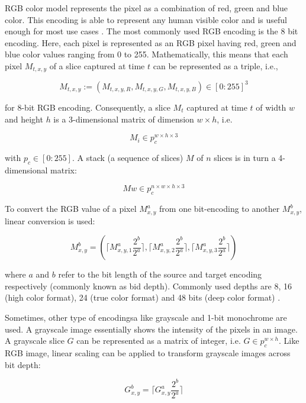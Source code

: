 \documentclass[pdftex,12pt,a4paper]{report}
\begin{document}
RGB color model represents the pixel as a combination of red, green and blue color. This encoding is able to represent any human visible color and is useful enough for most use cases \cite{sonka2014image, jayant1993signal}. The most commonly used RGB encoding is the 8 bit encoding. Here, each pixel is represented as an RGB pixel having red, green and blue color values ranging from 0 to 255. Mathematically, this means that each pixel $M_{t,x,y}$ of a slice captured at time $t$ can be represented as a triple, i.e.,

\begin{equation}
\label{equation:rgb_pixel_def}
M_{t, x, y} := (M_{t, x, y, R}, M_{t, x, y, G}, M_{t, x, y, B}) \in [0:255]^3
\end{equation}

for 8-bit RGB encoding. Consequently, a slice $M_t$ captured at time $t$ of width $w$ and height $h$ is a 3-dimensional matrix of dimension $w \times h$, i.e.

$$
M_i \in p_c^{w \times h \times 3}
$$ 

with $p_c \in [0:255]$. A stack (a sequence of slices) $M$ of $n$ slices is in turn a 4-dimensional matrix:

$$
Mw \in p_c^{n \times w \times h \times 3}
$$ 

To convert the RGB value of a pixel $M^a_{x,y}$ from one bit-encoding to another $M^b_{x,y}$, linear conversion is used:

\begin{equation}
\label{equation:linear_conv_rgb}
M^b_{x,y} = (\lceil M^a_{x,y, 1} \frac{2^b}{2^a} \rceil, \lceil M^a_{x,y, 2} \frac{2^b}{2^a} \rceil, \lceil M^a_{x,y, 3} \frac{2^b}{2^a} \rceil)
\end{equation}

where $a$ and $b$ refer to the bit length of the source and target encoding respectively (commonly known as bid depth).  Commonly used depths are 8, 16 (high color format), 24 (true color format) and 48 bits (deep color format) \cite{lim1990two, sharma1997digital, sullivan2012overview}.

Sometimes, other type of encodingsa like grayscale and 1-bit monochrome are used. A grayscale image essentially shows the intensity of the pixels in an image. A grayscale slice $G$ can be represented as a matrix of integer, i.e. $G \in p_c^{w \times h}$. Like RGB image, linear scaling can be applied to transform grayscale images across bit depth:

\begin{equation}
\label{equation:linear_conv_gray}
G^b_{x,y} = \lceil G^a_{x,y} \frac{2^b}{2^a} \rceil
\end{equation}
\end{document}
